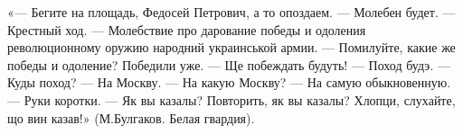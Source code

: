  
 
 
 
 


\obeycr
«— Бегите на площадь, Федосей Петрович, а то опоздаем.
— Молебен будет.
— Крестный ход.
— Молебствие про дарование победы и одоления революционному оружию народний украинськой армии.
— Помилуйте, какие же победы и одоление? Победили уже.
— Ще побеждать будуть!
— Поход будэ.
— Куды поход?
— На Москву.
— На какую Москву?
— На самую обыкновенную.
— Руки коротки.
— Як вы казалы? Повторить, як вы казалы? Хлопци, слухайте, що вин казав!»
(М.Булгаков. Белая гвардия).
\restorecr
